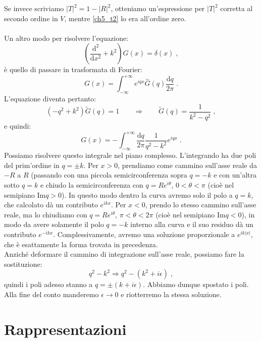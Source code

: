 \documentclass[10pt,a4paper]{report}
\theoremstyle{definition}
\numberwithin{equation}{section}
\newcommand{\diff}[1][]{\mathrm{d}#1}
\begin{document}
Se invece scriviamo $|T|^2=1-|R|^2$, otteniamo un'espressione per $|T|^2$ corretta al secondo ordine in $V$, mentre \eqref{ch5_t2} lo era all'ordine zero. \\
\\
Un altro modo per risolvere l'equazione:
\begin{equation}
\left(\frac{\diff^2}{\diff{x}^2}+k^2\right)G(x)=\delta(x)\;,
\end{equation}
è quello di passare in trasformata di Fourier:
\begin{equation}
G(x)=\int_{-\infty}^{+\infty}e^{iqx}\stackrel{\sim}{G}(q)\frac{\diff{q}}{2\pi}\;.
\end{equation}
L'equazione diventa pertanto:
\begin{equation}
(-q^2+k^2)\tilde{G}(q)=1 \qquad \Longrightarrow \qquad \tilde{G}(q)=\frac{1}{k^2-q^2}\;,
\end{equation}
e quindi:
\begin{equation}
G(x)=-\int_{-\infty}^{+\infty} \frac{\diff{q}}{2\pi}\frac{1}{q^2-k^2}e^{iqx}\;.
\end{equation}
Possiamo risolvere questo integrale nel piano complesso. L'integrando ha due poli del prim'ordine in $q=\pm k$. Per $x>0$, prendiamo come cammino sull'asse reale da $-R$ a $R$ (passando con una piccola semicirconferenza sopra $q=-k$ e con un'altra sotto $q=k$ e chiudo la semicirconferenza con $q=Re^{i\theta}$, $0<\theta<\pi$ (cioè nel semipiano $\mathrm{Im} q>0$). In questo modo dentro la curva avremo solo il polo a $q=k$, che calcolato dà un contributo $e^{ikx}$. Per $x<0$, prendo lo stesso cammino sull'asse reale, ma lo chiudiamo con $q=Re^{i\theta}$, $\pi<\theta<2\pi$ (cioè nel semipiano $\mathrm{Im} q<0$), in modo da avere solamente il polo $q=-k$ interno alla curva e il suo residuo dà un contributo $e^{-ikx}$. Complessivamente, avremo una soluzione proporzionale a $e^{ik|x|}$, che è esattamente la forma trovata in precedenza. \\
Anziché deformare il cammino di integrazione sull'asse reale, possiamo fare la sostituzione:
\begin{equation}
q^2-k^2\Longrightarrow q^2-(k^2+i\epsilon)\;,
\end{equation}
quindi i poli adesso stanno a $q=\pm(k+i\epsilon)$. Abbiamo dunque spostato i poli. Alla fine del conto manderemo $\epsilon\to 0$ e riotterremo la stessa soluzione.
\chapter{Rappresentazioni}
\end{document}
